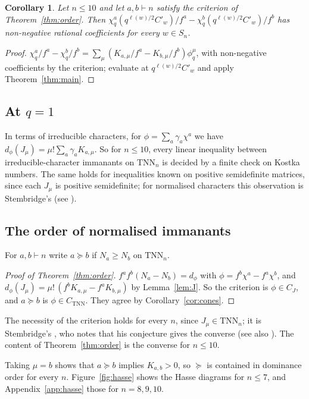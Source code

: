 \documentclass[11pt]{amsart}
\newtheorem{corollary}[theorem]{Corollary}
\theoremstyle{definition}
\theoremstyle{remark}
\newcommand{\TNN}{\mathrm{TNN}}
\newcommand{\CTNN}{C_{\mathrm{TNN}}}
\newcommand{\CJ}{C_{J}}
\begin{document}
\begin{corollary}\label{cor:qorder}
Let $n\le10$ and let $a,b\vdash n$ satisfy the criterion of Theorem~\ref{thm:order}. Then $\chi^a_q(q^{\ell(w)/2}C'_w)/f^a-\chi^b_q(q^{\ell(w)/2}C'_w)/f^b$ has non-negative rational coefficients for every $w\in S_n$.
\end{corollary}

\begin{proof}
$\chi^a_q/f^a-\chi^b_q/f^b=\sum_\mu(K_{a,\mu}/f^a-K_{b,\mu}/f^b)\phi^\mu_q$, with non-negative coefficients by the criterion; evaluate at $q^{\ell(w)/2}C'_w$ and apply Theorem~\ref{thm:main}.
\end{proof}

\subsection{At $q=1$}
In terms of irreducible characters, for $\phi=\sum_a\gamma_a\chi^a$ we have $d_\phi(J_\mu)=\mu!\sum_a\gamma_aK_{a,\mu}$. So for $n\le10$, every linear inequality between irreducible-character immanants on $\TNN_n$ is decided by a finite check on Kostka numbers. The same holds for inequalities known on positive semidefinite matrices, since each $J_\mu$ is positive semidefinite; for normalised characters this observation is Stembridge's \cite[\S3]{Ste92} (see \cite[Prop.~6.5]{McN}).

\subsection{The order of normalised immanants}
For $a,b\vdash n$ write $a\succeq b$ if $N_a\ge N_b$ on $\TNN_n$.

\begin{proof}[Proof of Theorem~\ref{thm:order}]
$f^af^b(N_a-N_b)=d_\phi$ with $\phi=f^b\chi^a-f^a\chi^b$, and $d_\phi(J_\mu)=\mu!\,(f^bK_{a,\mu}-f^aK_{b,\mu})$ by Lemma~\ref{lem:J}. So the criterion is $\phi\in\CJ$, and $a\succeq b$ is $\phi\in\CTNN$. They agree by Corollary~\ref{cor:cones}.
\end{proof}

The necessity of the criterion holds for every $n$, since $J_\mu\in\TNN_n$; it is Stembridge's \cite[Prop.~3.1]{Ste92}, who notes that his conjecture gives the converse (see also \cite[Prop.~6.3]{McN}). The content of Theorem~\ref{thm:order} is the converse for $n\le10$.

Taking $\mu=b$ shows that $a\succeq b$ implies $K_{a,b}>0$, so $\succeq$ is contained in dominance order for every $n$. Figure~\ref{fig:hasse} shows the Hasse diagrams for $n\le7$, and Appendix~\ref{app:hasse} those for $n=8,9,10$.
\end{document}

